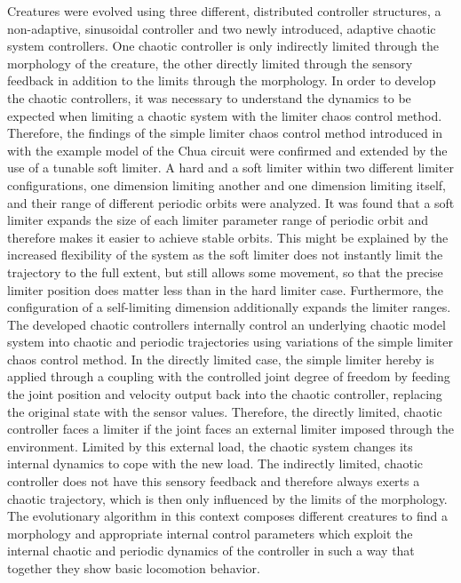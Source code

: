 \documentclass[main]{subfiles}
\begin{document}
Creatures were evolved using three different, distributed controller structures, a non-adaptive, sinusoidal controller and two newly introduced, adaptive chaotic system controllers. %
%
One chaotic controller is only indirectly limited through the morphology of the creature, the other directly limited through the sensory feedback in addition to the limits through the morphology. %
%
In order to develop the chaotic controllers, it was necessary to understand the dynamics to be expected when limiting a chaotic system with the limiter chaos control method. %
%
Therefore, the findings of the simple limiter chaos control method introduced in \cite{bib:Corron2000} with the example model of the Chua circuit \cite{bib:Matsumoto1985} were confirmed and extended by the use of a tunable soft limiter. %
%
A hard and a soft limiter within two different limiter configurations, one dimension limiting another and one dimension limiting itself, and their range of different periodic orbits were analyzed. %
%
It was found that a soft limiter expands the size of each limiter parameter range of periodic orbit and therefore makes it easier to achieve stable orbits. %
%
This might be explained by the increased flexibility of the system as the soft limiter does not instantly limit the trajectory to the full extent, but still allows some movement, so that the precise limiter position does matter less than in the hard limiter case. %
%
Furthermore, the configuration of a self-limiting dimension additionally expands the limiter ranges. %
%
The developed chaotic controllers internally control an underlying chaotic model system into chaotic and periodic trajectories using variations of the simple limiter chaos control method. %
%
In the directly limited case, the simple limiter hereby is applied through a coupling with the controlled joint degree of freedom by feeding the joint position and velocity output back into the chaotic controller, replacing the original state with the sensor values. %
%
Therefore, the directly limited, chaotic controller faces a limiter if the joint faces an external limiter imposed through the environment. %
%
Limited by this external load, the chaotic system changes its internal dynamics to cope with the new load. %
%
The indirectly limited, chaotic controller does not have this sensory feedback and therefore always exerts a chaotic trajectory, which is then only influenced by the limits of the morphology. %
%
The evolutionary algorithm in this context composes different creatures to find a morphology and appropriate internal control parameters which exploit the internal chaotic and periodic dynamics of the controller in such a way that together they show basic locomotion behavior. %
\end{document}
